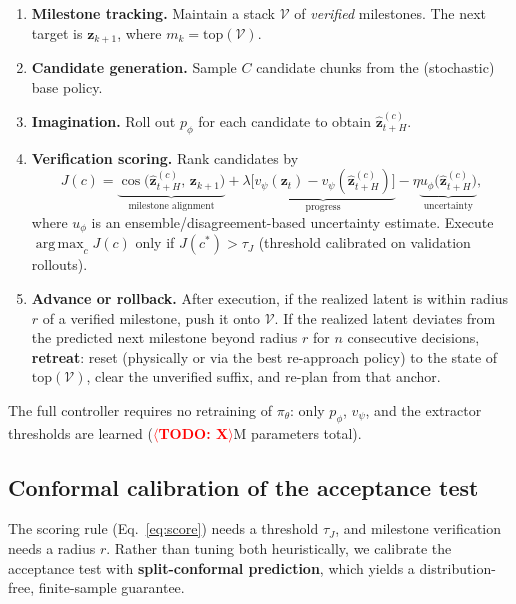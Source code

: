 \documentclass{article}
\newcommand{\TODO}[1]{\textcolor{red}{\textbf{$\langle$TODO: #1$\rangle$}}}
\newcommand{\z}{\mathbf{z}}
\DeclareMathOperator*{\argmax}{arg\,max}
\begin{document}
\begin{enumerate}[leftmargin=1.5em,itemsep=1pt]
  \item \textbf{Milestone tracking.} Maintain a stack $\mathcal{V}$ of \emph{verified} milestones. The next target is $\z_{k+1}$, where $m_k = \mathrm{top}(\mathcal{V})$.
  \item \textbf{Candidate generation.} Sample $C$ candidate chunks from the (stochastic) base policy.
  \item \textbf{Imagination.} Roll out $p_\phi$ for each candidate to obtain $\hat{\z}^{(c)}_{t+H}$.
  \item \textbf{Verification scoring.} Rank candidates by
  \begin{equation}
  J(c) = \underbrace{\cos\big(\hat{\z}^{(c)}_{t+H},\, \z_{k+1}\big)}_{\text{milestone alignment}} + \lambda \underbrace{\big[v_\psi(\z_t) - v_\psi(\hat{\z}^{(c)}_{t+H})\big]}_{\text{progress}} - \eta \underbrace{u_\phi\big(\hat{\z}^{(c)}_{t+H}\big)}_{\text{uncertainty}},
  \label{eq:score}
  \end{equation}
  where $u_\phi$ is an ensemble/disagreement-based uncertainty estimate. Execute $\argmax_c J(c)$ only if $J(c^\ast) > \tau_J$ (threshold calibrated on validation rollouts).
  \item \textbf{Advance or rollback.} After execution, if the realized latent is within radius $r$ of a verified milestone, push it onto $\mathcal{V}$. If the realized latent deviates from the predicted next milestone beyond radius $r$ for $n$ consecutive decisions, \textbf{retreat}: reset (physically or via the best re-approach policy) to the state of $\mathrm{top}(\mathcal{V})$, clear the unverified suffix, and re-plan from that anchor.
\end{enumerate}

The full controller requires no retraining of $\pi_\theta$: only $p_\phi$, $v_\psi$, and the extractor thresholds are learned (\TODO{X}M parameters total).

\subsection{Conformal calibration of the acceptance test}
\label{sec:conformal}

The scoring rule (Eq.~\ref{eq:score}) needs a threshold $\tau_J$, and milestone verification needs a radius $r$. Rather than tuning both heuristically, we calibrate the acceptance test with \textbf{split-conformal prediction}, which yields a distribution-free, finite-sample guarantee.
\end{document}

